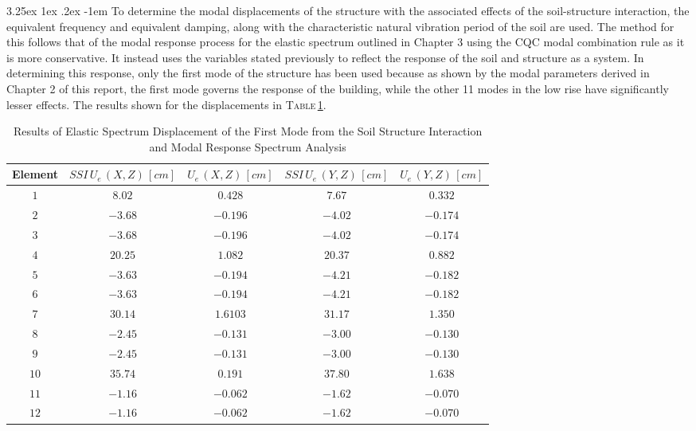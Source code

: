 \documentclass[11pt,a4paper,titlepage]{report}
\makeatletter
\renewcommand\paragraph{\@startsection{paragraph}{5}{\z@}%
  {3.25ex \@plus1ex \@minus.2ex}%
  {-1em}%
  {\normalfont\normalsize\bfseries}}
\makeatother
\begin{document}
\paragraph{}To determine the modal displacements of the structure with the associated effects of the soil-structure interaction, the equivalent frequency and equivalent damping, along with the characteristic natural vibration period of the soil are used. The method for this follows that of the modal response process for the elastic spectrum outlined in Chapter 3 using the CQC modal combination rule as it is more conservative. It instead uses the variables stated previously to reflect the response of the soil and structure as a system. In determining this response, only the first mode of the structure has been used because as shown by the modal parameters derived in Chapter 2 of this report, the first mode governs the response of the building, while the other 11 modes in the low rise have significantly lesser effects. The results shown for the displacements in \textsc{Table}\,\ref{tab:SSI displacements}.
\begin{table}[h]
    \centering
    \begin{tabular}{c|c|c|c|c}
    Element & $SSI\,U_{e}\, (X,Z)\, [cm]$ & $U_{e}\, (X,Z)\, [cm]$  & $ SSI\,U_{e} \,(Y,Z)\, [cm]$ & $U_{e} \,(Y,Z)\, [cm]$ \\
        \hline
   $1$ & $8.02$ & $0.428$ & $ 7.67$ & $0.332$ \\
  $2$ & $-3.68$ & $-0.196$ & $-4.02$ & $-0.174$ \\
  $3$ & $-3.68$ & $-0.196$ & $-4.02$ & $-0.174$ \\ 
   $4$ & $20.25$ & $1.082$ & $20.37$ & $0.882$ \\
   $5$ & $-3.63$ & $-0.194$ & $-4.21$ & $-0.182$ \\
   $6$ & $-3.63$ & $-0.194$ & $-4.21$ & $-0.182$ \\
    $7$ &$30.14$ & $1.6103$ & $31.17$ & $1.350$ \\
  $8$ & $-2.45$ & $-0.131$ & $-3.00$ & $-0.130$ \\
  $9$ & $-2.45$ & $-0.131$ & $-3.00$ & $-0.130$ \\
   $10$ & $35.74$ & $0.191$ & $37.80$ & $1.638$ \\
  $11$ & $-1.16$ & $-0.062$ & $-1.62$ & $-0.070$ \\
  $12$ & $-1.16$ & $-0.062$ & $-1.62$ & $-0.070$ \\
    \end{tabular}
    \caption{Results of Elastic Spectrum Displacement of the First Mode from the Soil Structure Interaction and Modal Response Spectrum Analysis}
    \label{tab:SSI displacements}
\end{table}
\end{document}
